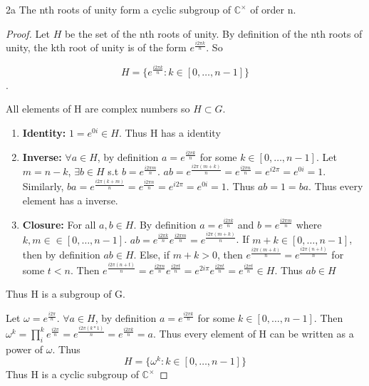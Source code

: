 \documentclass{article}
\newcommand{\C}{\mathbb{C}}
\begin{document}
\bigskip

\begin{claim}{2a}
    The nth roots of unity form a cyclic subgroup of $\C^\times$ of order n.
\end{claim}
\begin{proof}
    Let $H$ be the set of the nth roots of unity. By definition of the nth roots of unity, the kth root of unity is of the form $e^{\frac{i2\pi k}{n}}$. So 

    $$H = \{e^{\frac{i2\pi k}{n}} : k \in [0, \ldots, n-1]\}$$.

    All elements of H are complex numbers so $H \subset G$. 

    \begin{enumerate}{}
        \item \textbf{Identity: } $1 = e^{0i} \in H$. Thus H has a identity
        \item \textbf{Inverse: } $\forall a \in H$, by definition $a = e^{\frac{i2\pi k}{n}}$ for some $k \in [0, \ldots, n-1]$. Let $m = n - k$, $\exists b\in H$ s.t $b = e^{\frac{i2\pi m}{n}}$. $ab = e^{\frac{i2\pi(m+k)}{n}} = e^{\frac{i2\pi n}{n}} = e^{i 2\pi} = e^{0i} = 1$. Similarly, $ba = e^{\frac{i2\pi(k+m)}{n}} = e^{\frac{i2\pi n}{n}} = e^{i 2\pi} = e^{0i} = 1$. Thus $ab = 1 = ba$. Thus every element has a inverse.
        \item \textbf{Closure: } For all $a, b \in H$. By definition $a = e^{\frac{i2\pi k}{n}}$ and $b = e^{\frac{i2\pi m}{n}}$ where $k, m \in \in [0, \ldots, n-1]$. $ab = e^{\frac{i2\pi k}{n}}e^{\frac{i2\pi m}{n}} = e^{\frac{i2\pi(m+k)}{n}}$. If $m+k \in [0, \ldots, n-1]$, then by definition $ab \in H$. Else, if $m + k > 0$, then $e^{\frac{i2\pi(m+k)}{n}} = e^{\frac{i2\pi(n + t)}{n}}$ for some $t < n$. Then $e^{\frac{i2\pi(n + t)}{n}} = e^{\frac{i2\pi n}{n}}e^{\frac{i2\pi t}{n}} = e^{2i \pi}e^{\frac{i2\pi t}{n}} = e^{\frac{i2\pi t}{n}} \in H$. Thus $ab \in H$
    \end{enumerate}

    Thus H is a subgroup of G. 

    Let $\omega = e^{\frac{i2\pi}{n}}$. $\forall a \in H$, by definition $a = e^{\frac{i2\pi k}{n}}$ for some $k \in [0, \ldots, n-1]$. Then $\omega^k = \prod_{i}^{k}e^{\frac{i2\pi}{n}} = e^{\frac{i2\pi(k*1)}{n}} = e^{\frac{i2\pi k}{n}} = a$. Thus every element of H can be written as a power of $\omega$. Thus $$H = \{\omega^k : k \in [0, \ldots, n-1]\}$$ Thus H is a cyclic subgroup of $\C^\times$
\end{proof}
\end{document}

